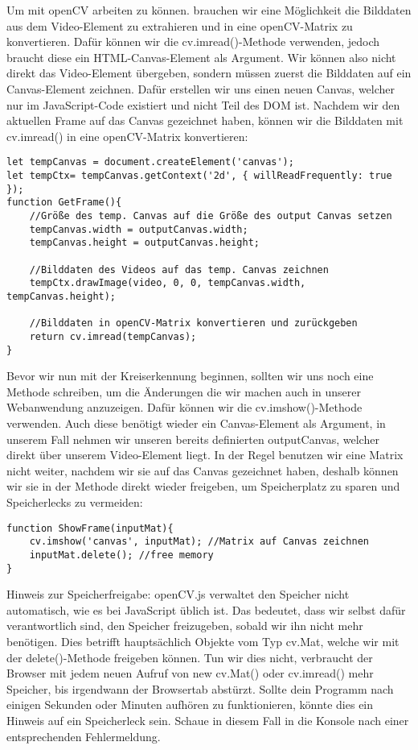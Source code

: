 \documentclass{article}
\begin{document}
Um mit openCV arbeiten zu können. brauchen wir eine Möglichkeit die Bilddaten aus dem Video-Element zu extrahieren und in eine openCV-Matrix zu konvertieren. Dafür können wir die cv.imread()-Methode verwenden, jedoch braucht diese ein HTML-Canvas-Element als Argument. Wir können also nicht direkt das Video-Element übergeben, sondern müssen zuerst die Bilddaten auf ein Canvas-Element zeichnen. Dafür erstellen wir uns einen neuen Canvas, welcher nur im JavaScript-Code existiert und nicht Teil des DOM ist. Nachdem wir den aktuellen Frame auf das Canvas gezeichnet haben, können wir die Bilddaten mit cv.imread() in eine openCV-Matrix konvertieren:

\begin{lstlisting}[style=JavaScript]
let tempCanvas = document.createElement('canvas');
let tempCtx= tempCanvas.getContext('2d', { willReadFrequently: true });
function GetFrame(){
    //Größe des temp. Canvas auf die Größe des output Canvas setzen
    tempCanvas.width = outputCanvas.width;
    tempCanvas.height = outputCanvas.height;

    //Bilddaten des Videos auf das temp. Canvas zeichnen
    tempCtx.drawImage(video, 0, 0, tempCanvas.width, tempCanvas.height);

    //Bilddaten in openCV-Matrix konvertieren und zurückgeben
    return cv.imread(tempCanvas);
}
\end{lstlisting}

Bevor wir nun mit der Kreiserkennung beginnen, sollten wir uns noch eine Methode schreiben, um die Änderungen die wir machen auch in unserer Webanwendung anzuzeigen. Dafür können wir die cv.imshow()-Methode verwenden. Auch diese benötigt wieder ein Canvas-Element als Argument, in unserem Fall nehmen wir unseren bereits definierten outputCanvas, welcher direkt über unserem Video-Element liegt. In der Regel benutzen wir eine Matrix nicht weiter, nachdem wir sie auf das Canvas gezeichnet haben, deshalb können wir sie in der Methode direkt wieder freigeben, um Speicherplatz zu sparen und Speicherlecks zu vermeiden:

\begin{lstlisting}[style=JavaScript]
function ShowFrame(inputMat){
    cv.imshow('canvas', inputMat); //Matrix auf Canvas zeichnen
    inputMat.delete(); //free memory
}
\end{lstlisting}

Hinweis zur Speicherfreigabe: openCV.js verwaltet den Speicher nicht automatisch, wie es bei JavaScript üblich ist. Das bedeutet, dass wir selbst dafür verantwortlich sind, den Speicher freizugeben, sobald wir ihn nicht mehr benötigen. Dies betrifft hauptsächlich Objekte vom Typ cv.Mat, welche wir mit der delete()-Methode freigeben können. Tun wir dies nicht, verbraucht der Browser mit jedem neuen Aufruf von new cv.Mat() oder cv.imread() mehr Speicher, bis irgendwann der Browsertab abstürzt. Sollte dein Programm nach einigen Sekunden oder Minuten aufhören zu funktionieren, könnte dies ein Hinweis auf ein Speicherleck sein. Schaue in diesem Fall in die Konsole nach einer entsprechenden Fehlermeldung.
\end{document}
